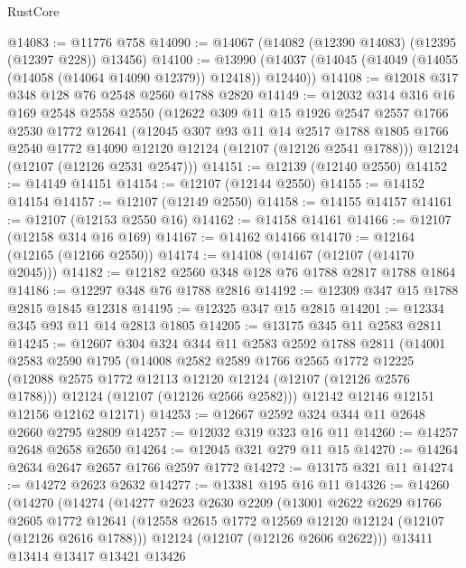 \begin{lexlean}{RustCore}
\begin{coremodule}
@14083 := @11776 @758
@14090 := @14067 (@14082 (@12390 @14083) (@12395 (@12397 @228)) @13456)
@14100 := @13990 (@14037 (@14045 (@14049 (@14055 (@14058 (@14064 @14090 @12379)) @12418)) @12440))
@14108 := @12018 @317 @348 @128 @76 @2548 @2560 @1788 @2820
@14149 := @12032
    @314
    @316
    @16
    @169
    @2548
    @2558
    @2550
    (@12622
      @309
      @11
      @15
      @1926
      @2547
      @2557
      @1766
      @2530
      @1772
      @12641
      (@12045
        @307
        @93
        @11
        @14
        @2517
        @1788
        @1805
        @1766
        @2540
        @1772
        @14090
        @12120
        @12124
        (@12107 (@12126 @2541 @1788)))
      @12124
      (@12107 (@12126 @2531 @2547)))
@14151 := @12139 (@12140 @2550)
@14152 := @14149 @14151
@14154 := @12107 (@12144 @2550)
@14155 := @14152 @14154
@14157 := @12107 (@12149 @2550)
@14158 := @14155 @14157
@14161 := @12107 (@12153 @2550 @16)
@14162 := @14158 @14161
@14166 := @12107 (@12158 @314 @16 @169)
@14167 := @14162 @14166
@14170 := @12164 (@12165 (@12166 @2550))
@14174 := @14108 (@14167 (@12107 (@14170 @2045)))
@14182 := @12182 @2560 @348 @128 @76 @1788 @2817 @1788 @1864
@14186 := @12297 @348 @76 @1788 @2816
@14192 := @12309 @347 @15 @1788 @2815 @1845 @12318
@14195 := @12325 @347 @15 @2815
@14201 := @12334 @345 @93 @11 @14 @2813 @1805
@14205 := @13175 @345 @11 @2583 @2811
@14245 := @12607
    @304
    @324
    @344
    @11
    @2583
    @2592
    @1788
    @2811
    (@14001
      @2583
      @2590
      @1795
      (@14008
        @2582
        @2589
        @1766
        @2565
        @1772
        @12225
        (@12088 @2575 @1772 @12113 @12120 @12124 (@12107 (@12126 @2576 @1788)))
        @12124
        (@12107 (@12126 @2566 @2582)))
      @12142
      @12146
      @12151
      @12156
      @12162
      @12171)
@14253 := @12667 @2592 @324 @344 @11 @2648 @2660 @2795 @2809
@14257 := @12032 @319 @323 @16 @11
@14260 := @14257 @2648 @2658 @2650
@14264 := @12045 @321 @279 @11 @15
@14270 := @14264 @2634 @2647 @2657 @1766 @2597 @1772
@14272 := @13175 @321 @11
@14274 := @14272 @2623 @2632
@14277 := @13381 @195 @16 @11
@14326 := @14260
    (@14270
      (@14274
        (@14277
          @2623
          @2630
          @2209
          (@13001
            @2622
            @2629
            @1766
            @2605
            @1772
            @12641
            (@12558 @2615 @1772 @12569 @12120 @12124 (@12107 (@12126 @2616 @1788)))
            @12124
            (@12107 (@12126 @2606 @2622)))
          @13411
          @13414
          @13417
          @13421
          @13426

\end{coremodule}
\end{lexlean}
